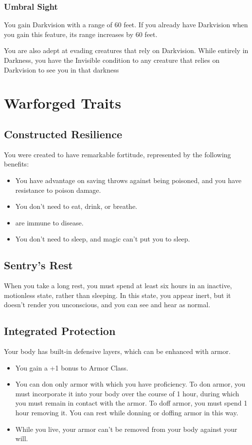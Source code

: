 \documentclass[letterpaper,openany,oneside,twocolumn]{book}
\begin{document}
\subsubsection*{Umbral Sight}
You gain Darkvision with a range of 60 feet. If you already have Darkvision when you gain this feature, its range increases by 60 feet.

You are also adept at evading creatures that rely on Darkvision. While entirely in Darkness, you have the Invisible condition to any creature that relies on Darkvision to see you in that darkness

\section*{Warforged Traits}
\subsection*{Constructed Resilience}
You were created to have remarkable fortitude, represented by the following benefits:
\begin{itemize}
	\item You have advantage on saving throws against being poisoned, and you have resistance to poison damage.
	\item You don't need to eat, drink, or breathe.
	\item  are immune to disease.
	\item You don't need to sleep, and magic can't put you to sleep.
\end{itemize}
\subsection*{Sentry's Rest}
When you take a long rest, you must spend at least six hours in an inactive, motionless state, rather than sleeping. In this state, you appear inert, but it doesn't render you unconscious, and you can see and hear as normal.
\subsection*{Integrated Protection}
Your body has built-in defensive layers, which can be enhanced with armor.
\begin{itemize}
	\item You gain a +1 bonus to Armor Class.
	\item You can don only armor with which you have proficiency. To don armor, you must incorporate it into your body over the course of 1 hour, during which you must remain in contact with the armor. To doff armor, you must spend 1 hour removing it. You can rest while donning or doffing armor in this way.
	\item While you live, your armor can't be removed from your body against your will.
\end{itemize}
\end{document}
